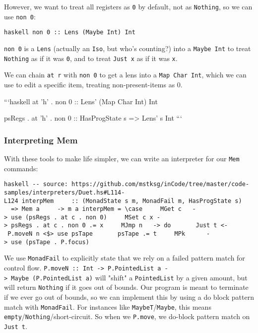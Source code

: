 \documentclass[]{article}
\begin{document}
However, we want to treat all registers as \texttt{0} by default, not as
\texttt{Nothing}, so we can use \texttt{non\ 0}:

\texttt{haskell\ non\ 0\ ::\ Lens\textquotesingle{}\ (Maybe\ Int)\ Int}

\texttt{non\ 0} is a \texttt{Lens} (actually an \texttt{Iso}, but who's
counting?) into a \texttt{Maybe\ Int} to treat \texttt{Nothing} as if it was
\texttt{0}, and to treat \texttt{Just\ x} as if it was \texttt{x}.

We can chain \texttt{at\ r} with \texttt{non\ 0} to get a lens into a
\texttt{Map\ Char\ Int}, which we can use to edit a specific item, treating
non-present-items as 0.

```haskell at 'h' . non 0 :: Lens' (Map Char Int) Int

psRegs . at 'h' . non 0 :: HasProgState s =\textgreater{} Lens' s Int ```

\subsubsection{Interpreting Mem}

With these tools to make life simpler, we can write an interpreter for our
\texttt{Mem} commands:

\texttt{haskell\ -\/-\ source:\ https://github.com/mstksg/inCode/tree/master/code-samples/interpreters/Duet.hs\#L114-L124\ interpMem\ \ \ \ \ ::\ (MonadState\ s\ m,\ MonadFail\ m,\ HasProgState\ s)\ \ \ \ \ =\textgreater{}\ Mem\ a\ \ \ \ \ -\textgreater{}\ m\ a\ interpMem\ =\ \textbackslash{}case\ \ \ \ \ MGet\ c\ \ \ -\textgreater{}\ use\ (psRegs\ .\ at\ c\ .\ non\ 0)\ \ \ \ \ MSet\ c\ x\ -\textgreater{}\ psRegs\ .\ at\ c\ .\ non\ 0\ .=\ x\ \ \ \ \ MJmp\ n\ \ \ -\textgreater{}\ do\ \ \ \ \ \ \ Just\ t\textquotesingle{}\ \textless{}-\ P.moveN\ n\ \textless{}\$\textgreater{}\ use\ psTape\ \ \ \ \ \ \ psTape\ .=\ t\textquotesingle{}\ \ \ \ \ MPk\ \ \ \ \ \ -\textgreater{}\ use\ (psTape\ .\ P.focus)}

We use \texttt{MonadFail} to explicitly state that we rely on a failed pattern
match for control flow.
\texttt{P.moveN\ ::\ Int\ -\textgreater{}\ P.PointedList\ a\ -\textgreater{}\ Maybe\ (P.PointedList\ a)}
will "shift" a \texttt{PointedList} by a given amount, but will return
\texttt{Nothing} if it goes out of bounds. Our program is meant to terminate if
we ever go out of bounds, so we can implement this by using a do block pattern
match with \texttt{MonadFail}. For instances like
\texttt{MaybeT}/\texttt{Maybe}, this means
\texttt{empty}/\texttt{Nothing}/short-circuit. So when we \texttt{P.move}, we
do-block pattern match on \texttt{Just\ t\textquotesingle{}}.
\end{document}

